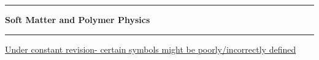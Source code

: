 \documentclass[11pt,                                          %
               a4paper,                                       %
               openany,                                                    oneside]{report}                               %
\newcommand{\theTitle}{Soft Matter and Polymer Physics}            %
\newcommand{\theAuthor}{}                  %
\begin{document}

\begin{titlepage}                                             %
\pagestyle{empty}                                             %
\centering                                                    %



\vspace{3cm}                                                 %
\hrule\vspace{5mm}                                            %
{\LARGE \textbf{{\theTitle}}} \\           %
\vspace{2mm}\hrule\vspace{1cm}
\vspace{2cm}

\large \underline{Under constant revision- certain symbols might be poorly/incorrectly defined} \\ \vspace{0.2cm}
\vfill                                                        
\cleardoublepage                                              %
\end{titlepage}

\setcounter{page}{1}                                          %

\newpage
\end{document}
